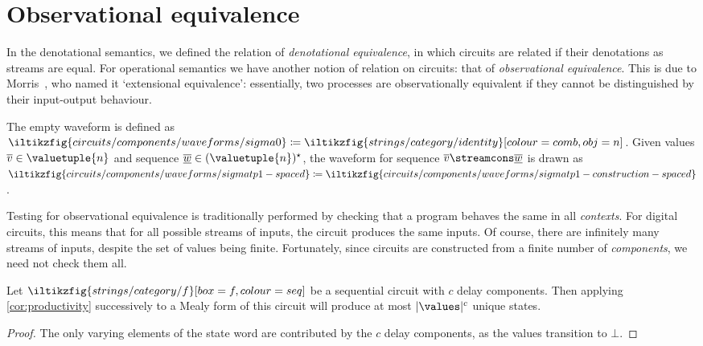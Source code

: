 \section{Observational equivalence}\label{sec:observational}

In the denotational semantics, we defined the relation of
\emph{denotational equivalence}, in which circuits are related if their
denotations as streams are equal.
For operational semantics we have another notion of relation on circuits: that
of \emph{observational equivalence}.
This is due to Morris~\cite{morris1969lambdacalculus}, who named it
`extensional equivalence': essentially, two processes are observationally
equivalent if they cannot be distinguished by their input-output behaviour.

\begin{notation}[Waveform]\label{def:waveform}
    The empty waveform is defined as \(
    \iltikzfig{circuits/components/waveforms/sigma0}
    \coloneqq
    \iltikzfig{strings/category/identity}[colour=comb,obj=n]
    \).
    Given values \(\overline{v} \in \valuetuple{n}\) and sequence \(
    \overline{\underline{w}} \in (\valuetuple{n})^\star
    \), the waveform for sequence \(
    \overline{v} \streamcons \overline{\underline{w}}
    \) is drawn as \(
    \iltikzfig{circuits/components/waveforms/sigmatp1-spaced}
    \coloneqq
    \iltikzfig{circuits/components/waveforms/sigmatp1-construction-spaced}
    \).
\end{notation}

Testing for observational equivalence is traditionally performed by checking
that a program behaves the same in all \emph{contexts}.
For digital circuits, this means that for all possible streams of inputs, the
circuit produces the same inputs.
Of course, there are infinitely many streams of inputs, despite the set of
values being finite.
Fortunately, since circuits are constructed from a finite number of
\emph{components}, we need not check them all.

\begin{lemma}\label{lem:number-of-states}
    Let \(
    \iltikzfig{strings/category/f}[box=f,colour=seq]
    \) be a sequential circuit with \(c\) delay components.
    Then applying \cref{cor:productivity} successively to a Mealy form of this
    circuit will produce at most \(|\values|^c\) unique states.
\end{lemma}
\begin{proof}
    The only varying elements of the state word are contributed by
    the \(c\) delay components, as the values transition to \(\bot\).
\end{proof}

